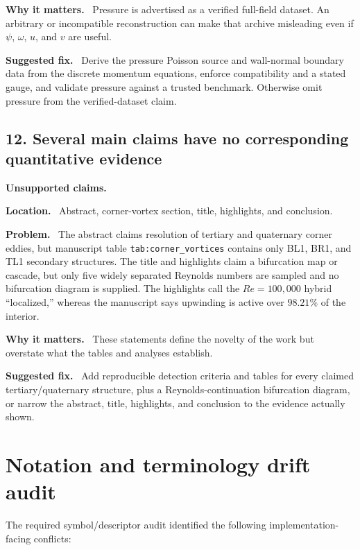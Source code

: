 \documentclass[11pt,a4paper]{article}
\newcommand{\classify}[1]{\textcolor{blue!65!black}{\textbf{#1}}}
\newcommand{\field}[1]{\par\noindent\textbf{#1}\ }
\begin{document}
\field{Why it matters.} Pressure is advertised as a verified full-field dataset. An arbitrary or incompatible reconstruction can make that archive misleading even if $\psi$, $\omega$, $u$, and $v$ are useful.

\field{Suggested fix.} Derive the pressure Poisson source and wall-normal boundary data from the discrete momentum equations, enforce compatibility and a stated gauge, and validate pressure against a trusted benchmark. Otherwise omit pressure from the verified-dataset claim.

\subsection*{12. Several main claims have no corresponding quantitative evidence}

\classify{Unsupported claims.}

\field{Location.} Abstract, corner-vortex section, title, highlights, and conclusion.

\field{Problem.} The abstract claims resolution of tertiary and quaternary corner eddies, but manuscript table \texttt{tab:corner\_vortices} contains only BL1, BR1, and TL1 secondary structures. The title and highlights claim a bifurcation map or cascade, but only five widely separated Reynolds numbers are sampled and no bifurcation diagram is supplied. The highlights call the $Re=100{,}000$ hybrid ``localized,'' whereas the manuscript says upwinding is active over $98.21\%$ of the interior.

\field{Why it matters.} These statements define the novelty of the work but overstate what the tables and analyses establish.

\field{Suggested fix.} Add reproducible detection criteria and tables for every claimed tertiary/quaternary structure, plus a Reynolds-continuation bifurcation diagram, or narrow the abstract, title, highlights, and conclusion to the evidence actually shown.

\section*{Notation and terminology drift audit}

The required symbol/descriptor audit identified the following implementation-facing conflicts:
\end{document}
